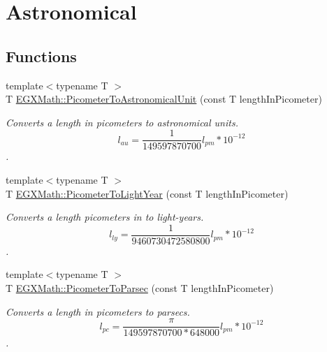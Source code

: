\hypertarget{group___e_g_x_math-_conversions-_length_conversions-_s_i-_picometer-_astronomical}{}\section{Astronomical}
\label{group___e_g_x_math-_conversions-_length_conversions-_s_i-_picometer-_astronomical}
\subsection*{Functions}
\begin{DoxyCompactItemize}
\item 
{\footnotesize template$<$typename T $>$ }\\T \mbox{\hyperlink{group___e_g_x_math-_conversions-_length_conversions-_s_i-_picometer-_astronomical_gae051f7eb0eb85b99c614183acc6b8ea6}{E\+G\+X\+Math\+::\+Picometer\+To\+Astronomical\+Unit}} (const T length\+In\+Picometer)
\begin{DoxyCompactList}\small\item\em Converts a length in picometers to astronomical units. \[ l_{au}= \frac{1}{149597870700} l_{pm} * 10^{-12} \]. \end{DoxyCompactList}\item 
{\footnotesize template$<$typename T $>$ }\\T \mbox{\hyperlink{group___e_g_x_math-_conversions-_length_conversions-_s_i-_picometer-_astronomical_ga4d8abbec265ae9e35ac109356db5b89a}{E\+G\+X\+Math\+::\+Picometer\+To\+Light\+Year}} (const T length\+In\+Picometer)
\begin{DoxyCompactList}\small\item\em Converts a length picometers in to light-\/years. \[ l_{ly}= \frac{1}{9460730472580800} l_{pm} * 10^{-12} \]. \end{DoxyCompactList}\item 
{\footnotesize template$<$typename T $>$ }\\T \mbox{\hyperlink{group___e_g_x_math-_conversions-_length_conversions-_s_i-_picometer-_astronomical_ga3248f6de04d23f6568866a8cd80188b6}{E\+G\+X\+Math\+::\+Picometer\+To\+Parsec}} (const T length\+In\+Picometer)
\begin{DoxyCompactList}\small\item\em Converts a length in picometers to parsecs. \[ l_{pc}=\frac{\pi}{149597870700 * 648000} l_{pm} * 10^{-12} \]. \end{DoxyCompactList}\end{DoxyCompactItemize}


